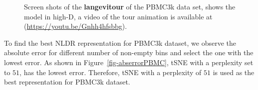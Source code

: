 \documentclass[
  12pt]{article}
\begin{document}
\begin{figure}[H]
\begin{minipage}{0.33\linewidth}
{}

\subcaption{\label{fig-pbmc1_sc2}}

\end{minipage}%
%
\begin{minipage}{0.33\linewidth}


\subcaption{\label{fig-pbmc1_sc3}}

\end{minipage}%

\caption{\label{fig-pbmc1_sc}Screen shots of the \textbf{langevitour} of
the PBMC3k data set, shows the model in high-D, a video of the tour
animation is available at (\url{https://youtu.be/Gnhh4hfsbbg}).}

\end{figure}%

To find the best NLDR representation for PBMC3k dataset, we observe the
absolute error for different number of non-empty bins and select the one
with the lowest error. As shown in Figure~\ref{fig-abserrorPBMC}, tSNE
with a perplexity set to \(51\), has the lowest error. Therefore, tSNE
with a perplexity of \(51\) is used as the best representation for
PBMC3k dataset.
\end{document}
